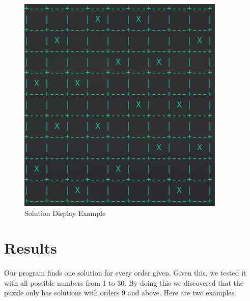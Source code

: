 \documentclass[runningheads]{llncs}
\begin{document}
\begin{figure}
    \begin{center}
        \includegraphics[scale=0.5]{images/fig2.png}
        \caption{Solution Display Example} \label{fig2}
    \end{center}
\end{figure}


\section{Results}
\paragraph{}
Our program finds one solution for every order given. Given this, we tested it with all possible numbers from 1 to 30.
By doing this we discovered that the puzzle only has solutions with orders 9 and above. Here are two examples.
\end{document}
